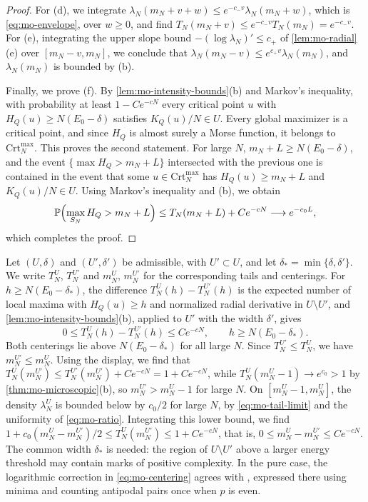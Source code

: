 \begin{proof}
For (d), we integrate $\lambda_N(m_N+v+w)\le e^{-c_-v}\lambda_N(m_N+w)$, which is \eqref{eq:mo-envelope}, over $w\ge0$, and find $T_N(m_N+v)\le e^{-c_-v}T_N(m_N)=e^{-c_-v}$. For (e), integrating the upper slope bound $-(\log\lambda_N)'\le c_+$ of \cref{lem:mo-radial}(e) over $[m_N-v,m_N]$, we conclude that $\lambda_N(m_N-v)\le e^{c_+v}\lambda_N(m_N)$, and $\lambda_N(m_N)$ is bounded by (b).

Finally, we prove (f). By \cref{lem:mo-intensity-bounds}(b) and Markov's inequality, with probability at least $1-Ce^{-cN}$ every critical point $u$ with $H_Q(u)\ge N(E_0-\delta)$ satisfies $K_Q(u)/N\in U$. Every global maximizer is a critical point, and since $H_Q$ is almost surely a Morse function, it belongs to $\mathrm{Crt}_N^{\max}$. This proves the second statement. For large $N$, $m_N+L\ge N(E_0-\delta)$, and the event $\{\max H_Q>m_N+L\}$ intersected with the previous one is contained in the event that some $u\in\mathrm{Crt}_N^{\max}$ has $H_Q(u)\ge m_N+L$ and $K_Q(u)/N\in U$. Using Markov's inequality and (b), we obtain
\[
\mathbb P\Bigl(\max_{S_N}H_Q>m_N+L\Bigr)\le T_N(m_N+L)+Ce^{-cN}\longrightarrow e^{-c_0L},
\]
which completes the proof.
\end{proof}

\begin{remark}\label{rem:mo-centering-U}
Let $(U,\delta)$ and $(U',\delta')$ be admissible, with $U'\subset U$, and let $\delta_*=\min\{\delta,\delta'\}$. We write $T_N^U$, $T_N^{U'}$ and $m_N^U$, $m_N^{U'}$ for the corresponding tails and centerings. For $h\ge N(E_0-\delta_*)$, the difference $T_N^U(h)-T_N^{U'}(h)$ is the expected number of local maxima with $H_Q(u)\ge h$ and normalized radial derivative in $U\setminus U'$, and \cref{lem:mo-intensity-bounds}(b), applied to $U'$ with the width $\delta'$, gives
\[
0\le T_N^U(h)-T_N^{U'}(h)\le Ce^{-cN},\qquad h\ge N(E_0-\delta_*).
\]
Both centerings lie above $N(E_0-\delta_*)$ for all large $N$. Since $T_N^{U'}\le T_N^U$, we have $m_N^{U'}\le m_N^U$. Using the display, we find that $T_N^U(m_N^{U'})\le T_N^{U'}(m_N^{U'})+Ce^{-cN}=1+Ce^{-cN}$, while $T_N^U(m_N^U-1)\to e^{c_0}>1$ by \cref{thm:mo-microscopic}(b), so $m_N^{U'}>m_N^U-1$ for large $N$. On $[m_N^U-1,m_N^U]$, the density $\lambda_N^U$ is bounded below by $c_0/2$ for large $N$, by \eqref{eq:mo-tail-limit} and the uniformity of \eqref{eq:mo-ratio}. Integrating this lower bound, we find $1+c_0(m_N^U-m_N^{U'})/2\le T_N^U(m_N^{U'})\le1+Ce^{-cN}$, that is, $0\le m_N^U-m_N^{U'}\le Ce^{-cN}$. The common width $\delta_*$ is needed: the region of $U\setminus U'$ above a larger energy threshold may contain marks of positive complexity. In the pure case, the logarithmic correction in \eqref{eq:mo-centering} agrees with \cite[Eq.~(1.4)]{SubagZeitouni2017}, expressed there using minima and counting antipodal pairs once when $p$ is even.
\end{remark}


